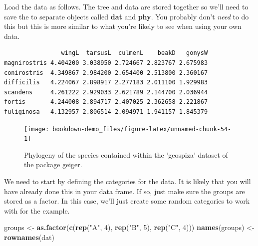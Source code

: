 \documentclass[
]{book}
\newenvironment{Shaded}{\begin{snugshade}}{\end{snugshade}}
\newcommand{\DecValTok}[1]{\textcolor[rgb]{0.00,0.00,0.81}{#1}}
\newcommand{\KeywordTok}[1]{\textcolor[rgb]{0.13,0.29,0.53}{\textbf{#1}}}
\newcommand{\NormalTok}[1]{#1}
\newcommand{\OperatorTok}[1]{\textcolor[rgb]{0.81,0.36,0.00}{\textbf{#1}}}
\newcommand{\StringTok}[1]{\textcolor[rgb]{0.31,0.60,0.02}{#1}}
\begin{document}
Load the data as follows. The tree and data are stored together so we'll need to save the to separate objects called \textbf{dat} and \textbf{phy}. You probably don't \emph{need} to do this but this is more similar to what you're likely to see when using your own data.

\begin{Shaded}
\end{Shaded}

\begin{verbatim}
                wingL  tarsusL  culmenL    beakD   gonysW
magnirostris 4.404200 3.038950 2.724667 2.823767 2.675983
conirostris  4.349867 2.984200 2.654400 2.513800 2.360167
difficilis   4.224067 2.898917 2.277183 2.011100 1.929983
scandens     4.261222 2.929033 2.621789 2.144700 2.036944
fortis       4.244008 2.894717 2.407025 2.362658 2.221867
fuliginosa   4.132957 2.806514 2.094971 1.941157 1.845379
\end{verbatim}

\begin{figure}[H]

{\centering \texttt{[image: bookdown-demo\_files/figure-latex/unnamed-chunk-54-1]} 

}

\caption{Phylogeny of the species contained within the 'geospiza' dataset of the package geiger.}\label{fig:unnamed-chunk-54}
\end{figure}

We need to start by defining the categories for the data. It is likely that you will have already done this in your data frame. If so, just make sure the groups are stored as a factor. In this case, we'll just create some random categories to work with for the example.

\begin{Shaded}
\begin{Highlighting}[]
\NormalTok{groups \textless{}{-}}\StringTok{ }\KeywordTok{as.factor}\NormalTok{(}\KeywordTok{c}\NormalTok{(}\KeywordTok{rep}\NormalTok{(}\StringTok{"A"}\NormalTok{, }\DecValTok{4}\NormalTok{), }\KeywordTok{rep}\NormalTok{(}\StringTok{"B"}\NormalTok{, }\DecValTok{5}\NormalTok{), }\KeywordTok{rep}\NormalTok{(}\StringTok{"C"}\NormalTok{, }\DecValTok{4}\NormalTok{)))}
\KeywordTok{names}\NormalTok{(groups) \textless{}{-}}\StringTok{ }\KeywordTok{rownames}\NormalTok{(dat)}
\end{Highlighting}
\end{Shaded}
\end{document}
